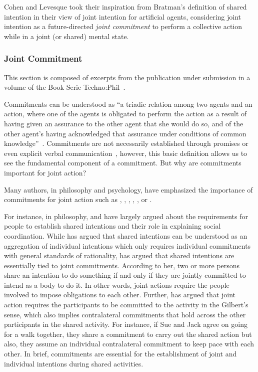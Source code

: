 \documentclass[a4paper,11pt,twoside]{StyleThese}
\begin{document}
Cohen and Levesque took their inspiration from Bratman's definition of shared intention in their view of joint intention for artificial agents, considering joint intention as a future-directed \emph{joint commitment} to perform a collective action while in a joint (or shared) mental state.

\subsubsection{Joint Commitment}\label{chap1:subsubsec:joint_commit}
This section is composed of excerpts from the publication under submission in a volume of the Book Serie Techno:Phil~\citep{castro_2021_role}.

Commitments can be understood as ``a triadic relation among two agents and an action, where one of the agents is obligated to perform the action as a result of having given an assurance to the other agent that she would do so, and of the other agent’s having acknowledged that assurance under conditions of common knowledge''~\citep[p.~756]{michael_2017_commitment}. Commitments are not necessarily established through promises or even explicit verbal communication~\citep{ledyard_1994_public, scanlon_2000_we, siposova_2018_communicative}, however, this basic definition allows us to see the fundamental component of a commitment. But why are commitments important for joint action?

Many authors, in philosophy and psychology, have emphasized the importance of commitments for joint action such as \cite{cohen_1991_teamwork}, \cite{clark_2006_social}, \cite{gilbert_2009_shared}, \cite{bratman_2014_shared}, \cite{michael_2015_commitments}, \cite{roth_2014_shared} or \cite{siposova_2018_communicative}. 

For instance, in philosophy, \cite{gilbert_2009_shared} and \cite{bratman_2014_shared} have largely argued about the requirements for people to establish shared intentions and their role in explaining social coordination. While \citeauthor{bratman_2014_shared} has argued that shared intentions can be understood as an aggregation of individual intentions which only requires individual commitments with general standards of rationality, \citeauthor{gilbert_2009_shared} has argued that shared intentions are essentially tied to joint commitments. According to her, two or more persons share an intention to do something if and only if they are jointly committed to intend as a body to do it. In other words, joint actions require the people involved to impose obligations to each other. Further, \cite{roth_2014_shared} has argued that joint action requires the participants to be committed to the activity in the Gilbert’s sense, which also implies contralateral commitments that hold across the other participants in the shared activity. For instance, if Sue and Jack agree on going for a walk together, they share a commitment to carry out the shared action but also, they assume an individual contralateral commitment to keep pace with each other. In brief, commitments are essential for the establishment of joint and individual intentions during shared activities. 
\end{document}
